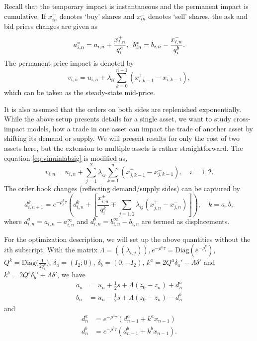 Recall that the temporary impact is instantaneous and the permanent impact is cumulative. If $x_{in}^+$ denotes `buy' shares and $x_{in}^-$ denotes `sell' shares, the ask and bid prices changes are given as
	\begin{equation}
	a_{i,n}^*= a_{i,n} + \dfrac{x_{i,n}^+}{q_i^a}, \enskip b_{in}^*= b_{i,n} - \dfrac{x_{i,n}^-}{q_i^b}.
	\end{equation}
The permanent price impact is denoted by
	\begin{equation} \label{eq:vinuinlabsig}
	v_{i,n}= u_{i,n} + \lambda_{ii} \sum_{k=0}^{n-1} (x_{i,k-1}^+ - x_{i,k-1}^-),
	\end{equation}
which can be taken as the steady-state mid-price. 


It is also assumed that the orders on both sides are replenished exponentially. While the above setup presents details for a single asset, we want to study cross-impact models, how a trade in one asset can impact the trade of another asset by shifting its demand or supply. We will present results for only the cost of two assets here, but the extension to multiple assets is rather straightforward. The equation \eqref{eq:vinuinlabsig} is modified as,
	\begin{equation}
	v_{i,n}= u_{i,n} + \sum_{j=1}^2 \lambda_{ij} \sum_{k=1}^n (x_{j,k-1}^+ - x_{j,k-1}^-), \quad i=1,2.
	\end{equation}
The order book changes (reflecting demand/supply sides) can be captured by
	\begin{equation}
	d_{i,n+1}^k = e^{-\rho_i^k \tau} \left( d_{i,n}^k + \left[ \dfrac{x_{i,n}^\pm}{q_i^k} \mp \sum_{j=1,2} \lambda_{ij} (x_{j,n}^+ - x_{j,n}^-) \right] \right), \quad k=a,b,
	\end{equation}
where $d_{i,n}^a= a_{i,n} - a_{i,n}^\infty$ and $d_{i,n}^b= b_{i,n}^\infty - b_{i,n}$ are termed as displacements. 


For the optimization description, we will set up the above quantities without the $i$th subscript. With the matrix $\Lambda= ((\lambda_{i,j})), e^{-\rho^k \tau}= \text{Diag}(e^{-\rho_i^k})$, $Q^k= \text{Diag}\big( \frac{1}{2q_i^k} \big)$, $\delta_a= (I_2;0)$, $\delta_b= (0, -I_2)$, $k^a= 2Q^a \delta_a' - \Lambda \delta'$ and $k^b= 2Q^b \delta_b' + \Lambda \delta'$, we have
	\begin{equation}
	\begin{split}
	a_n&= u_n + \frac{1}{2}s + \Lambda(z_0 - z_n) + d_n^a \\
	b_n&= u_n - \frac{1}{2}s + \Lambda(z_0 - z_n) - d_n^b 
	\end{split}
	\end{equation}
and
	\begin{equation}
	\begin{split}
	d_n^a&= e^{-\rho^a \tau} (d_{n-1}^a + k^a x_{n-1}) \\
	d_n^b&= e^{-\rho^b \tau} (d_{n-1}^b + k^b x_{n-1}).
	\end{split}
	\end{equation}


